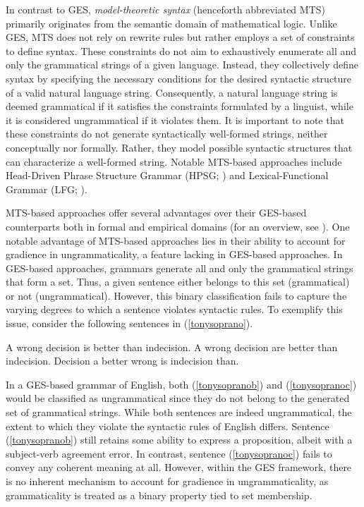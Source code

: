 In contrast to GES, \textit{model-theoretic syntax} (henceforth abbreviated MTS) primarily originates from the semantic domain of mathematical logic. Unlike GES, MTS does not rely on rewrite rules but rather employs a set of constraints to define syntax. These constraints do not aim to exhaustively enumerate all and only the grammatical strings of a given language. Instead, they collectively define syntax by specifying the necessary conditions for the desired syntactic structure of a valid natural language string. Consequently, a natural language string is deemed grammatical if it satisfies the constraints formulated by a linguist, while it is considered ungrammatical if it violates them. It is important to note that these constraints do not generate syntactically well-formed strings, neither conceptually nor formally. Rather, they model possible syntactic structures that can characterize a well-formed string.  Notable MTS-based approaches include Head-Driven Phrase Structure Grammar (HPSG; \citealp{pollardetal1994, muller:2021}) and Lexical-Functional Grammar (LFG; \citealp{kaplan&bresnan_1982, Dalrymple2019}).

MTS-based approaches offer several advantages over their GES-based counterparts both in formal and empirical domains (for an overview, see \citealp{pullumetal_2001, Sag2011}). One notable advantage of MTS-based approaches lies in their ability to account for gradience in ungrammaticality, a feature lacking in GES-based approaches. In GES-based approaches, grammars generate all and only the grammatical strings that form a set. Thus, a given sentence either belongs to this set (grammatical) or not (ungrammatical). However, this binary classification fails to capture the varying degrees to which a sentence violates syntactic rules. To exemplify this issue, consider the following sentences in (\ref{tonysoprano}). 

\pex[glspace=!1em,everygla={},everyglb={},aboveglbskip=-.15ex, interpartskip=5pt]
\label{tonysoprano}
\a \label{tonysopranoa}A wrong decision is better than indecision.
\a \label{tonysopranob}\ljudge{*} A wrong decision are better than indecision.
\a \label{tonysopranoc}\ljudge{**} Decision a better wrong is indecision than.
\xe

In a GES-based grammar of English, both (\ref{tonysopranob}) and (\ref{tonysopranoc}) would be classified as ungrammatical since they do not belong to the generated set of grammatical strings. While both sentences are indeed ungrammatical, the extent to which they violate the syntactic rules of English differs. Sentence (\ref{tonysopranob}) still retains some ability to express a proposition, albeit with a subject-verb agreement error. In contrast, sentence (\ref{tonysopranoc}) fails to convey any coherent meaning at all. However, within the GES framework, there is no inherent mechanism to account for gradience in ungrammaticality, as grammaticality is treated as a binary property tied to set membership.

